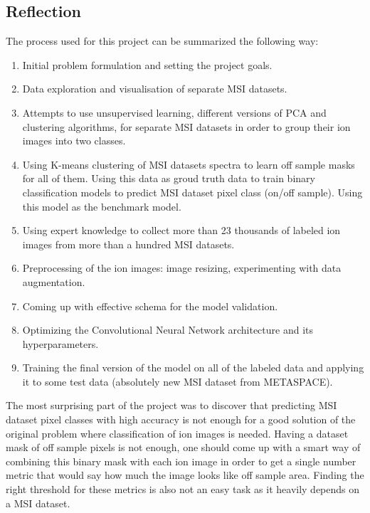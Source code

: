 \documentclass[a4paper]{article}
\begin{document}
\subsection*{Reflection}

The process used for this project can be summarized the following way:

\begin{enumerate}
    \item Initial problem formulation and setting the project goals.
    \item Data exploration and visualisation of separate MSI datasets.
    \item Attempts to use unsupervised learning, different versions of PCA and clustering algorithms,
    for separate MSI datasets in order to group their ion images into two classes.
    \item Using K-means clustering of MSI datasets spectra to learn off sample masks for all of them. Using this data as 
    groud truth data to train binary classification models to predict MSI dataset pixel class (on/off sample).
    Using this model as the benchmark model.
    \item Using expert knowledge to collect more than 23 thousands of labeled ion images from more than a hundred MSI datasets.
    \item Preprocessing of the ion images: image resizing, experimenting with data augmentation.
    \item Coming up with effective schema for the model validation.
    \item Optimizing the Convolutional Neural Network architecture and its hyperparameters.
    \item Training the final version of the model on all of the labeled data and applying it to some test data
    (absolutely new MSI dataset from METASPACE).
\end{enumerate}

The most surprising part of the project was to discover that predicting MSI dataset pixel classes with high accuracy
is not enough for a good solution of the original problem where classification of ion images is needed.
Having a dataset mask of off sample pixels is not enough, one should come up with a smart way 
of combining this binary mask with each ion image in order to get a single number metric that
would say how much the image looks like off sample area.
Finding the right threshold for these metrics is also not an easy task as it heavily depends on a MSI dataset.
\end{document}
